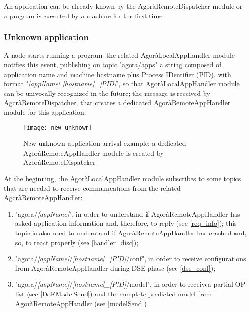 An application can be already known by the Agorà\-Remote\-Dis\-patch\-er module or a program is executed by a machine for the first time.

\subsubsection{Unknown application}

A node starts running a program; the related AgoràLocalAppHandler module notifies this event, publishing on topic "agora/apps" a string composed of application name and machine hostname plus Process IDentifier (PID), with format "\textit{[appName] [hostname]\_[PID]}", so that AgoràLocalAppHandler module can be univocally recognized in the future; the message is received by AgoràRemoteDispatcher, that creates a dedicated AgoràRemoteAppHandler module for this application:

\begin{figure}[H]

    \centering
    \texttt{[image: new\_unknown]}
    \caption[New unknown application arrival example]{New unknown application arrival example; a dedicated AgoràRemoteAppHandler module is created by AgoràRemoteDispatcher}
    
\end{figure}

At the beginning, the AgoràLocalAppHandler module subscribes to some topics that are needed to receive communications from the related AgoràRemoteAppHandler:

\begin{enumerate}

    \item "agora/\textit{[appName]}", in order to understand if AgoràRemoteAppHandler has asked application information and, therefore, to reply (see \ref{req_info}); this topic is also used to understand if Agorà\-Remote\-App\-Handler has crashed and, so, to react properly (see \ref{handler_disc});
    
    \item "agora/\textit{[appName]}/\textit{[hostname]\_[PID]}/conf", in order to receive configurations from AgoràRemoteAppHandler during DSE phase (see \ref{dse_conf});
    
    \item "agora/\textit{[appName]}/\textit{[hostname]\_[PID]}/model", in order to receive\linebreak a partial OP list (see \ref{DoEModelSend}) and the complete predicted model from AgoràRemoteAppHandler (see \ref{modelSend}).

\end{enumerate}

